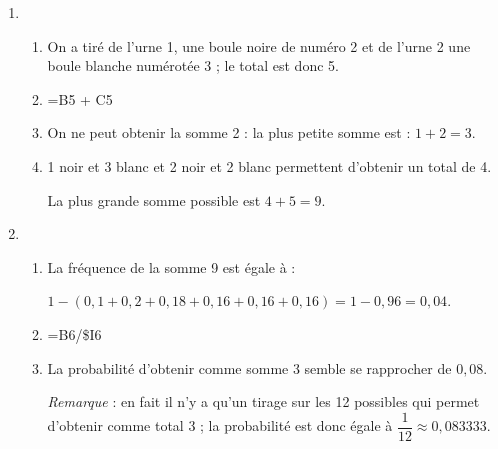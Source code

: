 \documentclass[10pt]{article}
\begin{document}
\begin{enumerate}
\item 
	\begin{enumerate}
			\item On a tiré de l’urne 1, une boule noire de numéro 2 et de l’urne 2 une boule blanche numérotée 3 ; le total est donc 5.
			\item =B5 + C5
			\item On ne peut obtenir la somme 2 : la plus petite somme est : $1 + 2 = 3$.
			\item 1 noir et 3 blanc et 2 noir et 2 blanc permettent d’obtenir un total de 4.
			
La plus grande somme possible est $4 + 5 = 9$.
	\end{enumerate}
\item 
		\begin{enumerate}
			\item La fréquence de la somme 9 est égale à :
			
$1 - (0,1 +0,2 + 0,18 + 0,16 + 0,16 + 0,16) = 1 - 0,96 = 0,04$.
			\item =B6/\$I6
			\item La probabilité d’obtenir comme somme 3 semble se rapprocher de $0,08$.
			
\emph{Remarque } : en fait il n’y a qu’un tirage sur les 12 possibles qui permet d’obtenir comme total 3 ; la probabilité est donc égale à $\dfrac{1}{12} \approx 0,083333$.
		\end{enumerate}
\end{enumerate}
\end{document}
